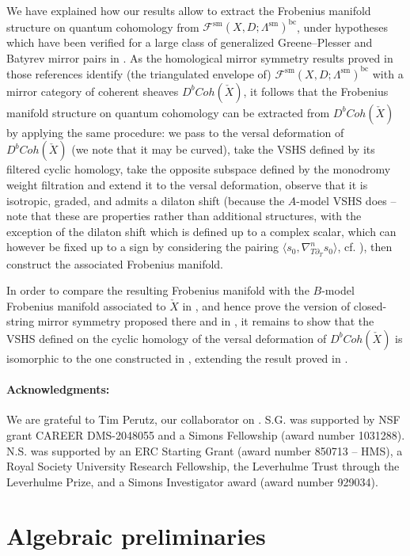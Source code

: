 \documentclass{article}
\def\fuk{\EuF}
\def\bc{\mathsf{bc}}
\def\fuk{\mathcal{F}}
\def\bc{{\operatorname{bc}}}
\def\sm{{\operatorname{sm}}}
\begin{document}
We have explained how our results allow to extract the Frobenius manifold structure on quantum cohomology from $\fuk^\sm(X,D;\Lambda^\sm)^\bc$, under hypotheses which have been verified for a large class of generalized Greene--Plesser and Batyrev mirror pairs in \cite{sheridan2021homological,GHHPS}. 
As the homological mirror symmetry results proved in those references identify (the triangulated envelope of) $\fuk^\sm(X,D;\Lambda^\sm)^\bc$ with a mirror category of coherent sheaves $D^bCoh(\check{X})$, it follows that the Frobenius manifold structure on quantum cohomology can be extracted from $D^bCoh(\check{X})$ by applying the same procedure: we pass to the versal deformation of $D^bCoh(\check{X})$ (we note that it may be curved), take the VSHS defined by its filtered cyclic homology, take the opposite subspace defined by the monodromy weight filtration and extend it to the versal deformation, observe that it is isotropic, graded, and admits a dilaton shift (because the $A$-model VSHS does -- note that these are properties rather than additional structures, with the exception of the dilaton shift which is defined up to a complex scalar, which can however be fixed up to a sign by considering the pairing $\langle s_0,\nabla_{T \partial_T}^n s_0 \rangle$, cf. \cite[Section 6.2]{Ganatra2015}), then construct the associated Frobenius manifold. 

In order to compare the resulting Frobenius manifold with the $B$-model Frobenius manifold associated to $\check{X}$ in \cite{BK}, and hence prove the version of closed-string mirror symmetry proposed there and in \cite{Barannikov,Barannikov:MS}, it remains to show that the VSHS defined on the cyclic homology of the versal deformation of $D^bCoh(\check{X})$ is isomorphic to the one constructed in \cite[Section 4]{Barannikov}, extending the result proved in \cite[Theorem 0.1]{Tu:HKR}.

\paragraph{Acknowledgments:} We are grateful to Tim Perutz, our collaborator on \cite{Ganatra2015}. S.G. was supported by NSF grant CAREER DMS-2048055 and a Simons Fellowship (award number 1031288).
N.S. was supported by an ERC Starting Grant (award number 850713 – HMS), a Royal Society University Research Fellowship, the Leverhulme Trust through the Leverhulme Prize, and a Simons Investigator award (award number 929034).

\section{Algebraic preliminaries}
\end{document}

